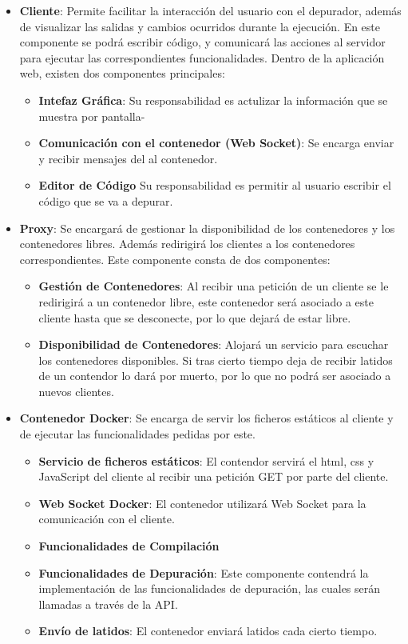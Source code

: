 \begin{itemize}
    \item \textbf{Cliente}: Permite facilitar la interacción del usuario con el depurador, además de visualizar las salidas y cambios ocurridos durante la ejecución. En este componente se podrá escribir código, y comunicará las acciones al servidor para ejecutar las correspondientes funcionalidades. 
    Dentro de la aplicación web, existen dos componentes principales:

    \begin{itemize}
        \item \textbf{Intefaz Gráfica}: Su responsabilidad es actulizar la información que se muestra por pantalla-
        \item \textbf{Comunicación con el contenedor (Web Socket)}: Se encarga enviar y recibir mensajes del al contenedor.
        \item \textbf{Editor de Código} Su responsabilidad es permitir al usuario escribir el código que se va a depurar.
    \end{itemize}

    \item \textbf{Proxy}: Se encargará de gestionar la disponibilidad de los contenedores y los contenedores libres. Además redirigirá los clientes a los contenedores correspondientes.
    Este componente consta de dos componentes:
    \begin{itemize}
        \item \textbf{Gestión de Contenedores}: Al recibir una petición de un cliente se le redirigirá a un contenedor libre, este contenedor será asociado a este cliente hasta que se desconecte, por lo que dejará de estar libre.
        \item \textbf{Disponibilidad de Contenedores}: Alojará un servicio para escuchar los contenedores disponibles. Si tras cierto tiempo deja de recibir latidos de un contendor lo dará por muerto, por lo que no podrá ser asociado a nuevos clientes.  
    \end{itemize}

    \item \textbf{Contenedor Docker}: Se encarga de servir los ficheros estáticos al cliente y de ejecutar las funcionalidades pedidas por este.
    \begin{itemize}
        \item \textbf{Servicio de ficheros estáticos}: El contendor servirá el html, css y JavaScript del cliente al recibir una petición GET por parte del cliente.
        \item \textbf{Web Socket Docker}: El contenedor utilizará Web Socket para la comunicación con el cliente.
        \item \textbf{Funcionalidades de Compilación}
        \item \textbf{Funcionalidades de Depuración}: Este componente contendrá la implementación de las funcionalidades de depuración, las cuales serán llamadas a través de la API.
        \item \textbf{Envío de latidos}: El contenedor enviará latidos cada cierto tiempo.
    \end{itemize}
\end{itemize}

